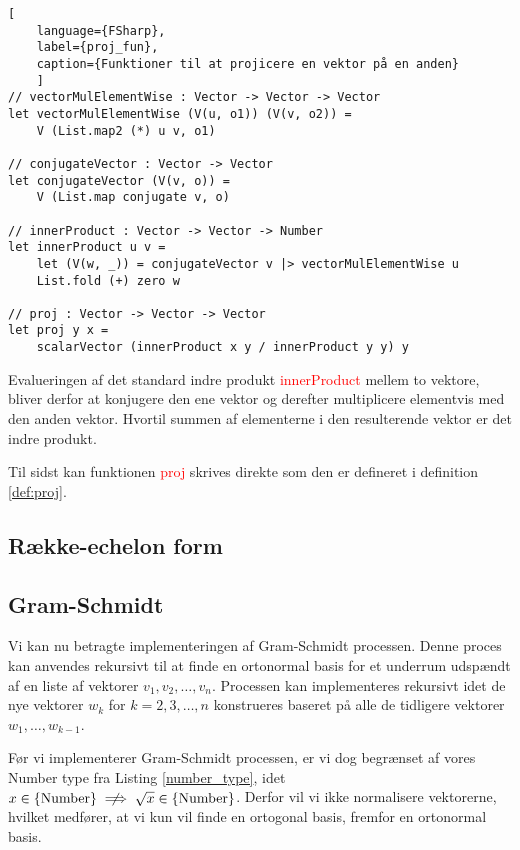 \begin{lstlisting}[
    language={FSharp}, 
    label={proj_fun}, 
    caption={Funktioner til at projicere en vektor på en anden}
    ]
// vectorMulElementWise : Vector -> Vector -> Vector
let vectorMulElementWise (V(u, o1)) (V(v, o2)) =
    V (List.map2 (*) u v, o1)

// conjugateVector : Vector -> Vector
let conjugateVector (V(v, o)) = 
    V (List.map conjugate v, o)

// innerProduct : Vector -> Vector -> Number
let innerProduct u v =
    let (V(w, _)) = conjugateVector v |> vectorMulElementWise u
    List.fold (+) zero w

// proj : Vector -> Vector -> Vector   
let proj y x =
    scalarVector (innerProduct x y / innerProduct y y) y
\end{lstlisting}

Evalueringen af det standard indre produkt \textcolor{red}{innerProduct} mellem to vektore, bliver derfor at konjugere den ene vektor og derefter multiplicere elementvis med den anden vektor. Hvortil summen af elementerne i den resulterende vektor er det indre produkt.

Til sidst kan funktionen \textcolor{red}{proj} skrives direkte som den er defineret i definition \ref{def:proj}.


\subsection{Række-echelon form}
\subsection{Gram-Schmidt}\label{sec:gram_schmidt}
Vi kan nu betragte implementeringen af Gram-Schmidt processen. Denne proces kan anvendes rekursivt til at finde en ortonormal basis for et underrum udspændt af en liste af vektorer $v_1, v_2, \ldots, v_n$. Processen kan implementeres rekursivt idet de nye vektorer $w_k$ for $k = 2, 3, \ldots, n$ konstrueres baseret på alle de tidligere vektorer $w_1, \ldots, w_{k-1}$. 

Før vi implementerer Gram-Schmidt processen, er vi dog begrænset af vores Number type fra Listing \ref{number_type}, idet $x \in \text{\{Number\}} \centernot\implies \sqrt{x} \in \text{\{Number\}}$. Derfor vil vi ikke normalisere vektorerne, hvilket medfører, at vi kun vil finde en ortogonal basis, fremfor en ortonormal basis.

